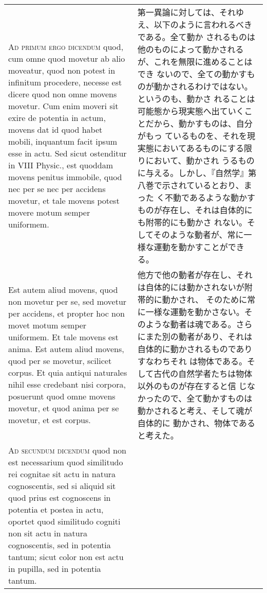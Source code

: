 \documentclass[10pt]{jsarticle} %
\begin{document}
\begin{longtable}{p{21em}p{21em}}
{\scshape Ad primum ergo dicendum} quod, cum omne quod movetur ab alio moveatur,
quod non potest in infinitum procedere, necesse est dicere quod non
omne movens movetur. Cum enim moveri sit exire de potentia in actum,
movens dat id quod habet mobili, inquantum facit ipsum esse in
actu. Sed sicut ostenditur in VIII Physic., est quoddam movens penitus
immobile, quod nec per se nec per accidens movetur, et tale movens
potest movere motum semper uniformem. 


&

第一異論に対しては、それゆえ、以下のように言われるべきである。全て動か
されるものは他のものによって動かされるが、これを無限に進めることはでき
ないので、全ての動かすものが動かされるわけではない。というのも、動かさ
れることは可能態から現実態へ出ていくことだから、動かすものは、自分がもっ
ているものを、それを現実態においてあるものにする限りにおいて、動かされ
うるものに与える。しかし、『自然学』第八巻で示されているとおり、まった
く不動であるような動かすものが存在し、それは自体的にも附帯的にも動かさ
れない。そしてそのような動者が、常に一様な運動を動かすことができる。


\\




Est autem aliud movens, quod non
movetur per se, sed movetur per accidens, et propter hoc non movet
motum semper uniformem. Et tale movens est anima. Est autem aliud
movens, quod per se movetur, scilicet corpus. Et quia antiqui
naturales nihil esse credebant nisi corpora, posuerunt quod omne
movens movetur, et quod anima per se movetur, et est corpus.


&

他方で他の動者が存在し、それは自体的には動かされないが附帯的に動かされ、
そのために常に一様な運動を動かさない。そのような動者は魂である。さら
にまた別の動者があり、それは自体的に動かされるものでありすなわちそれ
は物体である。そして古代の自然学者たちは物体以外のものが存在すると信
じなかったので、全て動かすものは動かされると考え、そして魂が自体的に
動かされ、物体であると考えた。


\\



{\scshape Ad secundum dicendum} quod non est necessarium quod similitudo rei
cognitae sit actu in natura cognoscentis, sed si aliquid sit quod
prius est cognoscens in potentia et postea in actu, oportet quod
similitudo cogniti non sit actu in natura cognoscentis, sed in
potentia tantum; sicut color non est actu in pupilla, sed in potentia
tantum. 


\end{longtable}
\end{document}

